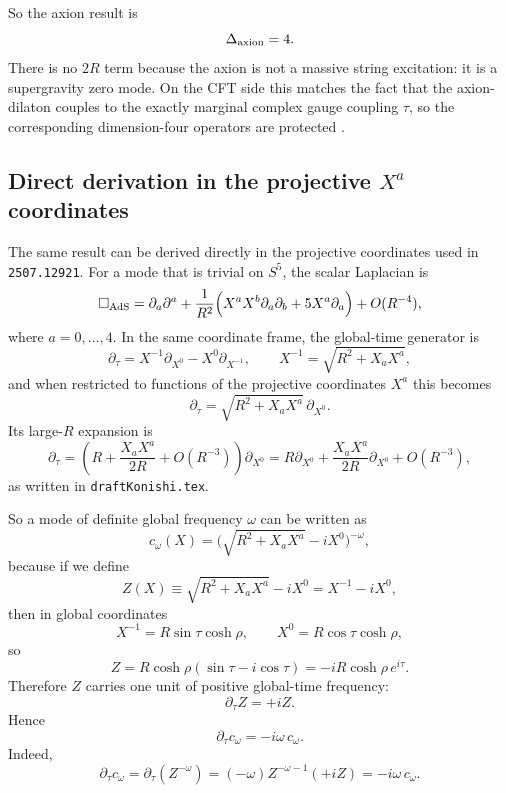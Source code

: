 \documentclass[12pt]{article}
\newcommand{\D}{\Delta}
\begin{document}
So the axion result is
\begin{equation}
\D_{\rm axion}=4.
\end{equation}
There is no $2R$ term because the axion is not a massive string excitation: it is a supergravity zero
mode.  On the CFT side this matches the fact that the axion-dilaton couples to the exactly marginal
complex gauge coupling $\tau$, so the corresponding dimension-four operators are protected
\cite{AharonyReview}.

\subsection*{Direct derivation in the projective $X^a$ coordinates}

The same result can be derived directly in the projective coordinates used in
\texttt{2507.12921}.  For a mode that is trivial on $S^5$, the scalar Laplacian is
\cite{SFT2507}
\begin{equation}
\Box_{\rm AdS}
=
\partial_a\partial^a
+\frac{1}{R^2}\Big(X^aX^b\partial_a\partial_b+5X^a\partial_a\Big)
+O(R^{-4}),
\end{equation}
where $a=0,\ldots,4$.  In the same coordinate frame, the global-time generator is
\begin{equation}
\partial_\tau=X^{-1}\partial_{X^0}-X^0\partial_{X^{-1}},
\qquad
X^{-1}=\sqrt{R^2+X_aX^a},
\end{equation}
and when restricted to functions of the projective coordinates $X^a$ this becomes
\begin{equation}
\partial_\tau
=
\sqrt{R^2+X_aX^a}\,\partial_{X^0}.
\end{equation}
Its large-$R$ expansion is
\begin{equation}
\partial_\tau
=
\left(R+\frac{X_aX^a}{2R}+O(R^{-3})\right)\partial_{X^0}
=
R\partial_{X^0}+\frac{X_aX^a}{2R}\partial_{X^0}+O(R^{-3}),
\end{equation}
as written in \texttt{draftKonishi.tex}.

So a mode of definite global frequency $\omega$ can be written as
\begin{equation}
c_\omega(X)=\Big(\sqrt{R^2+X_aX^a}-iX^0\Big)^{-\omega},
\end{equation}
because if we define
\[
Z(X)\equiv \sqrt{R^2+X_aX^a}-iX^0=X^{-1}-iX^0,
\]
then in global coordinates
\[
X^{-1}=R\sin\tau\cosh\rho,\qquad X^0=R\cos\tau\cosh\rho,
\]
so
\[
Z=R\cosh\rho(\sin\tau-i\cos\tau)=-iR\cosh\rho\,e^{i\tau}.
\]
Therefore $Z$ carries one unit of positive global-time frequency:
\[
\partial_\tau Z=+iZ.
\]
Hence
\begin{equation}
\partial_\tau c_\omega=-i\omega\,c_\omega.
\end{equation}
Indeed,
\[
\partial_\tau c_\omega
=
\partial_\tau(Z^{-\omega})
=
(-\omega)Z^{-\omega-1}(+iZ)
=
-i\omega\,c_\omega.
\]
\end{document}
